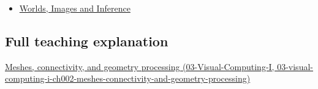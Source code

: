 \begin{itemize}
\tightlist
\item
  \href{Continuous\%20Notes/University\%20-\%20Worlds,\%20Images\%20and\%20Inference\%20-\%20Graphics,\%20Vision\%20and\%20Photography}{Worlds, Images and Inference}
\end{itemize}

\subsection{Full teaching explanation}\label{appendix-1dd4ad54ca57-full-teaching-explanation}

\href{../03-Visual-Computing-I/main.pdf\#nameddest=03-visual-computing-i-ch002-meshes-connectivity-and-geometry-processing}{Meshes, connectivity, and geometry processing (03-Visual-Computing-I, 03-visual-computing-i-ch002-meshes-connectivity-and-geometry-processing)}
